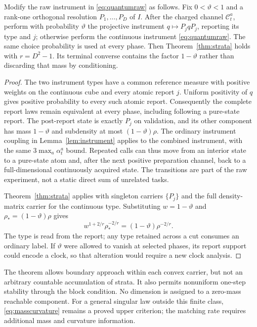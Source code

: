 \begin{corollary}\label{cor:validation}
Modify the raw instrument in \eqref{eq:quantumraw} as follows. Fix $0<\vartheta<1$ and a rank-one orthogonal resolution $P_1,\ldots,P_D$ of $I$. After the charged channel $\mathcal C_t^a$, perform with probability $\vartheta$ the projective instrument $q\mapsto P_jqP_j$, reporting its type and $j$; otherwise perform the continuous instrument \eqref{eq:quantumraw}. The same choice probability is used at every phase. Then Theorem~\ref{thm:strata} holds with $r=D^2-1$. Its terminal converse contains the factor $1-\vartheta$ rather than discarding that mass by conditioning.
\end{corollary}
\begin{proof}
The two instrument types have a common reference measure with positive weights on the continuous cube and every atomic report $j$. Uniform positivity of $q$ gives positive probability to every such atomic report. Consequently the complete report laws remain equivalent at every phase, including following a pure-state report. The post-report state is exactly $P_j$ on validation, and its other component has mass $1-\vartheta$ and subdensity at most $(1-\vartheta)\rho$. The ordinary instrument coupling in Lemma~\ref{lem:instrument} applies to the combined instrument, with the same $3\max_a\alpha_t^a$ bound. Repeated calls can thus move from an interior state to a pure-state atom and, after the next positive preparation channel, back to a full-dimensional continuously acquired state. The transitions are part of the raw experiment, not a static direct sum of unrelated tasks.

Theorem~\ref{thm:strata} applies with singleton carriers $\{P_j\}$ and the full density-matrix carrier for the continuous type. Substituting $w=1-\vartheta$ and $\rho_*=(1-\vartheta)\rho$ gives
\[
 w^{1+2/r}\rho_*^{-2/r}=(1-\vartheta)\rho^{-2/r}.
\]
The type is read from the report; any type retained across a cut consumes an ordinary label. If $\vartheta$ were allowed to vanish at selected phases, its report support could encode a clock, so that alteration would require a new clock analysis.
\end{proof}

The theorem allows boundary approach within each convex carrier, but not an arbitrary countable accumulation of strata. It also permits nonuniform one-step stability through the block condition. No dimension is assigned to a zero-mass reachable component. For a general singular law outside this finite class, \eqref{eq:masscurvature} remains a proved upper criterion; the matching rate requires additional mass and curvature information.
